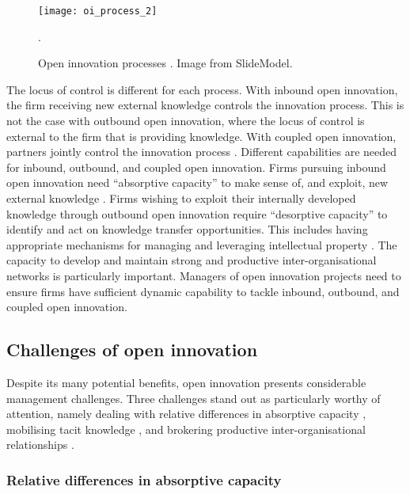 \begin{figure}
	\centering
	\texttt{[image: oi\_process\_2]}
	\caption{Open innovation processes \citep{chesbrough2004open}. Image from SlideModel\texttrademark.}.
	\label{fig:oi_process}
\end{figure}

The locus of control is different for each process. With inbound open innovation, the firm receiving new external knowledge controls the innovation process. This is not the case with outbound open innovation, where the locus of control is external to the firm that is providing knowledge. With coupled open innovation, partners jointly control the innovation process \citep{gassmann2004towards}. Different capabilities are needed for inbound, outbound, and coupled open innovation. Firms pursuing inbound open innovation need \enquote{absorptive capacity} to make sense of, and exploit, new external knowledge  \citep{vanhaverbeke2007connecting}. Firms wishing to exploit their internally developed knowledge through outbound open innovation require \enquote{desorptive capacity} to identify and act on knowledge transfer opportunities. This includes having appropriate mechanisms for managing and leveraging intellectual property \citep{lichtenthaler2010technology,chesbrough2012open}. The capacity to develop and maintain strong and productive inter-organisational networks is particularly important\citep{gassmann2004towards,chesbrough2012open}. Managers of open innovation projects need to ensure firms have sufficient dynamic capability to tackle inbound, outbound, and coupled open innovation. \medskip

\subsection{Challenges of open innovation}

Despite its many potential benefits, open innovation presents considerable management challenges. Three challenges stand out as particularly worthy of attention, namely dealing with relative differences in absorptive capacity \citep{vanhaverbeke2007connecting,robertson2012managing}, mobilising tacit knowledge \citep{wallin2010organizing,bogers2011open}, and brokering productive inter-organisational relationships \citep{fleming2007brokerage,gassmann2010future,whelan2011creating}. \medskip

\subsubsection{Relative differences in absorptive capacity}


